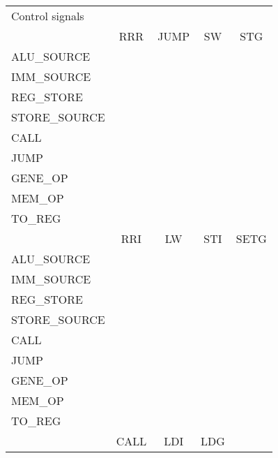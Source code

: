 \begin{table}
    \centering
    \begin{tabular}{| l | c | c | c |c |}
    \hline
    Control signals   &              &          &                   \\[0.5ex]
                      & RRR          & JUMP     &  SW   &  STG       \\
    \hline
    ALU\_SOURCE       &              &          &       &            \\
    IMM\_SOURCE       &              &          &       &            \\
    REG\_STORE        &              &          &       &            \\
    STORE\_SOURCE     &              &          &       &            \\
    CALL              &              &          &       &            \\
    JUMP              &              &          &       &            \\
    GENE\_OP          &              &          &       &            \\
    MEM\_OP           &              &          &       &            \\
    TO\_REG           &              &          &       &            \\
    \hline  
                      & RRI          & LW       & STI   & SETG       \\
    \hline
    ALU\_SOURCE       &              &          &       &            \\
    IMM\_SOURCE       &              &          &       &            \\
    REG\_STORE        &              &          &       &            \\
    STORE\_SOURCE     &              &          &       &            \\
    CALL              &              &          &       &            \\
    JUMP              &              &          &       &            \\
    GENE\_OP          &              &          &       &            \\
    MEM\_OP           &              &          &       &            \\
    TO\_REG           &              &          &       &            \\
    \hline
                      & CALL         & LDI      & LDG   &            \\

\end{tabular}
\end{table}
